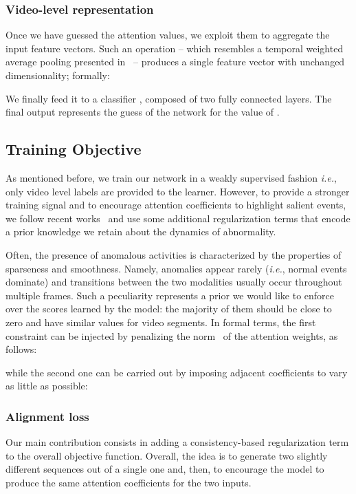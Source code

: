 \documentclass[runningheads]{llncs}
\begin{document}
\subsubsection{Video-level representation} Once we have guessed the attention values, we exploit them to aggregate the input feature vectors. Such an operation -- which resembles a temporal weighted average pooling presented in~\cite{porrello2019spotting} -- produces a single feature vector with unchanged dimensionality; formally:

We finally feed it to a classifier , composed of two fully connected layers. The final output represents the guess of the network for the value of .
\subsection{Training Objective} As mentioned before, we train our network in a weakly supervised fashion \textit{i.e.}, only video level labels are provided to the learner. However, to provide a stronger training signal and to encourage attention coefficients to highlight salient events, we follow recent works~\cite{cai2021appearance, yu2020cloze} and use some additional regularization terms that encode a prior knowledge we retain about the dynamics of abnormality.

Often, the presence of anomalous activities is characterized by the properties of sparseness and smoothness. Namely, anomalies appear rarely (\textit{i.e.}, normal events dominate) and transitions between the two modalities usually occur throughout multiple frames. Such a peculiarity represents a prior we would like to enforce over the scores learned by the model: the majority of them should be close to zero and have similar values for video segments. In formal terms, the first constraint can be injected by penalizing the  norm~\cite{cascianelli2021data} of the attention weights, as follows:

while the second one can be carried out by imposing adjacent coefficients to vary as little as possible:

\subsubsection{Alignment loss} Our main contribution consists in adding a consistency-based regularization term to the overall objective function. Overall, the idea is to generate two slightly different sequences out of a single one and, then, to encourage the model to produce the same attention coefficients for the two inputs.
\end{document}
